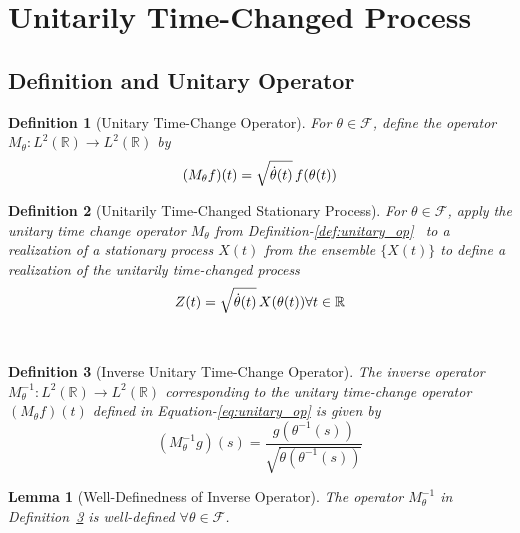 \documentclass{article}
\newtheorem{definition}{Definition}
\newtheorem{lemma}{Lemma}
{\theorembodyfont{\rmfamily}\newtheorem{remark}{Remark}}
\begin{document}
\section{Unitarily Time-Changed Process}\label{sec:time_change}

\subsection{Definition and Unitary Operator}

\begin{definition}
  [Unitary Time-Change Operator]\label{M}For $\theta \in \mathcal{F}$, define
  the operator $M_{\theta} : L^2 (\mathbb{R}) \to L^2 (\mathbb{R})$ by
  \begin{equation}
    \label{eq:unitary_op} (M_{\theta} f) (t) = \sqrt{\dot{\theta} (t)} 
    \hspace{0.17em} f (\theta (t))
  \end{equation}
\end{definition}

\begin{definition}
  [Unitarily Time-Changed Stationary Process]\label{def:time_changed_proc} For
  $\theta \in \mathcal{F}$, apply the unitary time change operator
  $M_{\theta}$ from Definition-\ref{def:unitary_op} \ to a realization of a
  stationary process $X (t)$ from the ensemble $\{ X (t) \}$ to define a
  realization of the unitarily time-changed process
  \begin{equation}
    \label{eq:time_change} Z (t) = \sqrt{\dot{\theta} (t)}  \hspace{0.17em} X
    (\theta (t))  \forall t \in \mathbb{R}
  \end{equation}
\end{definition}

\

\begin{definition}
  [Inverse Unitary Time-Change Operator]\label{def:inverse_unitary_op} The
  inverse operator $M_{\theta}^{- 1} : L^2 (\mathbb{R}) \to L^2 (\mathbb{R})$
  corresponding to the unitary time-change operator $(M_{\theta} f) (t)$
  defined in Equation-\ref{eq:unitary_op} is given by
  \begin{equation}
    \label{eq:unitary_inverse} (M_{\theta}^{- 1} g) (s) = \frac{g (\theta^{-
    1} (s))}{\sqrt{\dot{\theta} (\theta^{- 1} (s))}}
  \end{equation}
\end{definition}

\begin{lemma}
  [Well-Definedness of Inverse Operator]\label{lem:inverse_well_defined} The
  operator $M_{\theta}^{- 1}$ in Definition~\ref{def:inverse_unitary_op} is
  well-defined $\forall \theta \in \mathcal{F}$.
\end{lemma}
\end{document}
